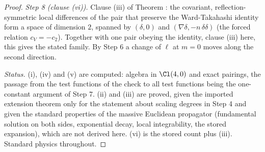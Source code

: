 \begin{proof}
\emph{Step 8 (clause (vi)).} Clause (iii) of Theorem : the covariant, reflection-symmetric local differences of the pair that preserve the Ward-Takahashi identity form a space of dimension $2$, spanned by $(\delta, 0)$ and $(\nabla\delta, -n\,\delta\delta)$ (the forced relation $c_{V} = -c_{2}$). Together with one pair obeying the identity, clause (iii) here, this gives the stated family. By Step 6 a change of $\ell$ at $m = 0$ moves along the second direction.

\emph{Status.} (i), (iv) and (v) are computed: algebra in $\Cl(4,0)$ and exact pairings, the passage from the test functions of the check to all test functions being the one-constant argument of Step 7. (ii) and (iii) are proved, given the imported extension theorem only for the statement about scaling degrees in Step 4 and given the standard properties of the massive Euclidean propagator (fundamental solution on both sides, exponential decay, local integrability, the stored expansion), which are not derived here. (vi) is the stored count plus (iii). Standard physics throughout.
\end{proof}
